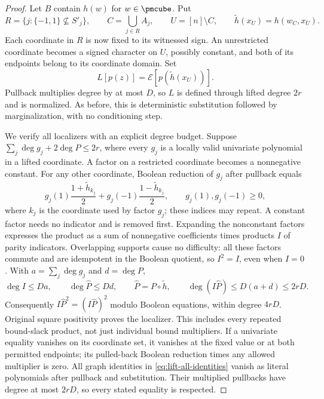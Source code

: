 \begin{proof}
Let $B$ contain $h(w)$ for $w\in\pmcube$. Put
\begin{equation}\label{eq:lift-restricted-supports}
 R=\{j:\{-1,1\}\not\subseteq S'_j\},\qquad
 C=\bigcup_{j\in R}A_j,\qquad U=[n]\setminus C,
 \qquad \widetilde h(x_U)=h(w_C,x_U).
\end{equation}
Each coordinate in $R$ is now fixed to its witnessed sign. An unrestricted
coordinate becomes a signed character on $U$, possibly constant, and both
of its endpoints belong to its coordinate domain. Set
\begin{equation}\label{eq:lift-node-functional}
 L[p(z)]=\mathcal E[p(\widetilde h(x_U))].
\end{equation}
Pullback multiplies degree by at most $D$, so $L$ is defined through
lifted degree $2r$ and is normalized. As before, this is deterministic
substitution followed by marginalization, with no conditioning step.

We verify all localizers with an explicit degree budget. Suppose
$\sum_j\deg g_j+2\deg P\le2r$, where every $g_j$ is a locally valid
univariate polynomial in a lifted coordinate. A factor on a restricted
coordinate becomes a nonnegative constant. For any other coordinate,
Boolean reduction of $g_j$ after pullback equals
\[
 g_j(1)\frac{1+\widetilde h_{k_j}}{2}
 +g_j(-1)\frac{1-\widetilde h_{k_j}}{2},
 \qquad g_j(1),g_j(-1)\ge0,
\]
where $k_j$ is the coordinate used by factor $g_j$; these indices may
repeat. A constant factor needs no indicator and is removed first. Expanding the
nonconstant factors expresses the product as a sum of nonnegative
coefficients times products $I$ of parity indicators. Overlapping supports
cause no difficulty: all these factors commute and are idempotent in the
Boolean quotient, so $I^2=I$, even when $I=0$. With
$a=\sum_j\deg g_j$ and $d=\deg P$,
\begin{equation}\label{eq:lift-degree-accounting}
 \deg I\le Da,\qquad \deg\widehat P\le Dd,
 \qquad\widehat P=P\circ\widetilde h,
 \qquad\deg(I\widehat P)\le D(a+d)\le2rD.
\end{equation}
Consequently $I\widehat P^2=(I\widehat P)^2$ modulo Boolean equations,
within degree $4rD$. Original square positivity proves the localizer.
This includes every repeated bound-slack product, not just individual
bound multipliers. If a univariate equality vanishes on its
coordinate set, it vanishes at the fixed value or at both permitted
endpoints; its pulled-back Boolean reduction times any allowed multiplier
is zero. All graph identities in \eqref{eq:lift-all-identities} vanish
as literal polynomials after pullback and substitution. Their multiplied
pullbacks have degree at most $2rD$, so every stated equality is respected.


\end{proof}
